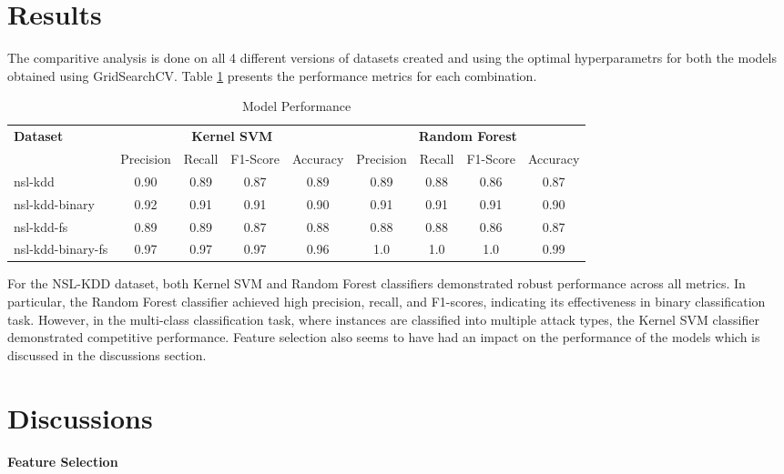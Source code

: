 \documentclass{article}
\begin{document}
\section{Results}

The comparitive analysis is done on all 4 different versions of datasets created and using the optimal hyperparametrs for both the models obtained using GridSearchCV. Table \ref{tab:model_performance} presents the performance metrics for each combination.

\begin{table}[htbp]
  \centering
  \setlength{\tabcolsep}{3pt} %
  \caption{Model Performance}
  \label{tab:model_performance}
  \begin{tabular}{@{}lcccccccc@{}}
  \toprule
  \textbf{Dataset} & \multicolumn{4}{c}{\textbf{Kernel SVM}} & \multicolumn{4}{c}{\textbf{Random Forest}} \\ 
  \cmidrule(lr){2-5} \cmidrule(lr){6-9}
  & Precision & Recall & F1-Score & Accuracy & Precision & Recall & F1-Score & Accuracy \\
  \midrule
  nsl-kdd & 0.90 & 0.89 & 0.87 & 0.89 & 0.89 & 0.88 & 0.86 & 0.87\\
  nsl-kdd-binary & 0.92 & 0.91 & 0.91 & 0.90 & 0.91 & 0.91 & 0.91 & 0.90\\
  nsl-kdd-fs & 0.89 & 0.89 & 0.87 & 0.88 & 0.88 & 0.88 & 0.86 & 0.87\\
  nsl-kdd-binary-fs & 0.97 & 0.97 & 0.97 & 0.96 & 1.0 & 1.0 & 1.0 & 0.99\\
  \bottomrule
  \end{tabular}
\end{table}

For the NSL-KDD dataset, both Kernel SVM and Random Forest classifiers demonstrated robust performance across all metrics. In particular, the Random Forest classifier achieved high precision, recall, and F1-scores, indicating its effectiveness in binary classification task. However, in the multi-class classification task, where instances are classified into multiple attack types, the Kernel SVM classifier demonstrated competitive performance. Feature selection also seems to have had an impact on the performance of the models which is discussed in the discussions section.


\section{Discussions}


\paragraph{Feature Selection}
\end{document}
